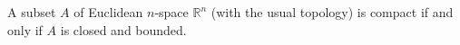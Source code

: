 A subset $A$ of Euclidean $n$-space $\mathbb{R}^n$ (with the usual topology) is compact if and only if $A$ is closed and bounded.
